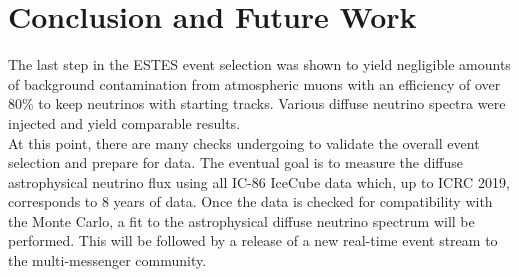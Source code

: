 \documentclass{PoS}
\begin{document}

\section{Conclusion and Future Work}\label{sec:Conclusion}
The last step in the ESTES event selection was shown to yield negligible amounts of background contamination from atmospheric muons with an efficiency of over 80$\%$ to keep neutrinos with starting tracks. Various diffuse neutrino spectra were injected and yield comparable results.
\\
At this point, there are many checks undergoing to validate the overall event selection and prepare for data. The eventual goal is to measure the diffuse astrophysical neutrino flux using all IC-86 IceCube data which, up to ICRC 2019, corresponds to 8 years of data. Once the data is checked for compatibility with the Monte Carlo, a fit to the astrophysical diffuse neutrino spectrum will be performed. This will be followed by a release of a new real-time event stream to the multi-messenger community. 





\end{document}
